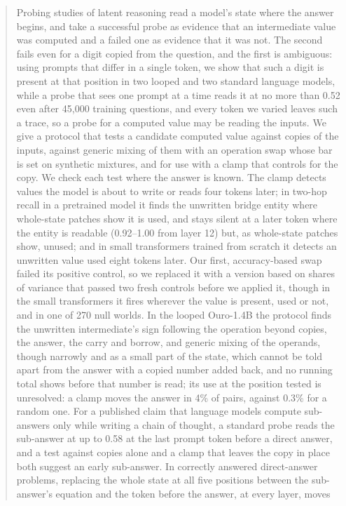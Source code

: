 \documentclass{article}
\begin{document}

\printAffiliationsAndNotice{}

\begin{abstract}
Probing studies of latent reasoning read a model's state where the answer begins, and take a successful probe as evidence that an intermediate value was computed and a failed one as evidence that it was not. The second fails even for a digit copied from the question, and the first is ambiguous: using prompts that differ in a single token, we show that such a digit is present at that position in two looped and two standard language models, while a probe that sees one prompt at a time reads it at no more than 0.52 even after 45,000 training questions, and every token we varied leaves such a trace, so a probe for a computed value may be reading the inputs. We give a protocol that tests a candidate computed value against copies of the inputs, against generic mixing of them with an operation swap whose bar is set on synthetic mixtures, and for use with a clamp that controls for the copy. We check each test where the answer is known. The clamp detects values the model is about to write or reads four tokens later; in two-hop recall in a pretrained model it finds the unwritten bridge entity where whole-state patches show it is used, and stays silent at a later token where the entity is readable (0.92--1.00 from layer 12) but, as whole-state patches show, unused; and in small transformers trained from scratch it detects an unwritten value used eight tokens later. Our first, accuracy-based swap failed its positive control, so we replaced it with a version based on shares of variance that passed two fresh controls before we applied it, though in the small transformers it fires wherever the value is present, used or not, and in one of 270 null worlds. In the looped Ouro-1.4B the protocol finds the unwritten intermediate's sign following the operation beyond copies, the answer, the carry and borrow, and generic mixing of the operands, though narrowly and as a small part of the state, which cannot be told apart from the answer with a copied number added back, and no running total shows before that number is read; its use at the position tested is unresolved: a clamp moves the answer in 4\% of pairs, against 0.3\% for a random one. For a published claim that language models compute sub-answers only while writing a chain of thought, a standard probe reads the sub-answer at up to 0.58 at the last prompt token before a direct answer, and a test against copies alone and a clamp that leaves the copy in place both suggest an early sub-answer. In correctly answered direct-answer problems, replacing the whole state at all five positions between the sub-answer's equation and the token before the answer, at every layer, moves 
\end{abstract}
\end{document}
